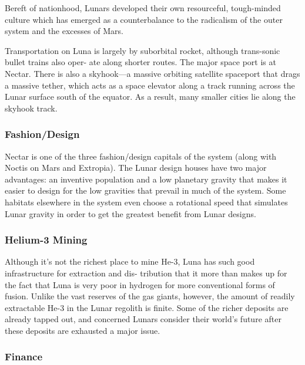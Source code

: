Bereft of nationhood, Lunars developed their own 
resourceful, tough-minded culture which has emerged 
as a counterbalance to the radicalism of the outer 
system and the excesses of Mars.

Transportation on Luna is largely by suborbital 
rocket, although trans-sonic bullet trains also oper-
ate along shorter routes. The major space port is at 
Nectar. There is also a skyhook—a massive orbiting 
satellite spaceport that drags a massive tether, which 
acts as a space elevator along a track running across 
the Lunar surface south of the equator. As a result, 
many smaller cities lie along the skyhook track.

\subsubsection{Fashion/Design}

Nectar is one of the three fashion/design capitals of 
the system (along with Noctis on Mars and Extropia). 
The Lunar design houses have two major advantages: 
an inventive population and a low planetary gravity 
that makes it easier to design for the low gravities that 
prevail in much of the system. Some habitats elsewhere 
in the system even choose a rotational speed that 
simulates Lunar gravity in order to get the greatest 
benefit from Lunar designs.

\subsubsection{Helium-3 Mining}

Although it's not the richest place to mine He-3, Luna 
has such good infrastructure for extraction and dis-
tribution that it more than makes up for the fact that 
Luna is very poor in hydrogen for more conventional 
forms of fusion. Unlike the vast reserves of the gas 
giants, however, the amount of readily extractable 
He-3 in the Lunar regolith is finite. Some of the richer 
deposits are already tapped out, and concerned Lunars 
consider their world's future after these deposits are 
exhausted a major issue.

\subsubsection{Finance}

